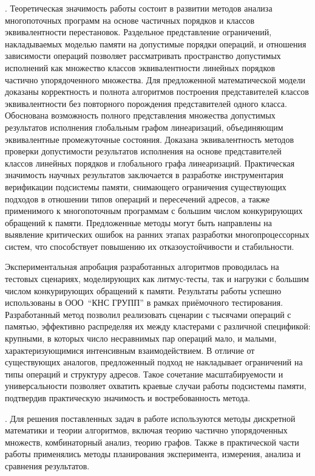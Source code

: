 {\influence}.
Теоретическая значимость работы состоит в развитии методов анализа
многопоточных программ на основе частичных порядков и классов
эквивалентности перестановок. Раздельное представление ограничений,
накладываемых моделью памяти на допустимые порядки операций, и
отношения зависимости операций позволяет рассматривать пространство
допустимых исполнений как множество классов эквивалентности линейных
порядков частично упорядоченного множества.
Для предложенной математической модели доказаны корректность и
полнота алгоритмов построения представителей классов эквивалентности
без повторного порождения представителей одного класса. Обоснована
возможность полного представления множества допустимых результатов
исполнения глобальным графом линеаризаций, объединяющим эквивалентные
промежуточные
состояния. Доказана эквивалентность методов проверки допустимости
результатов исполнения на основе представителей классов линейных
порядков и глобального графа линеаризаций.
Практическая значимость научных результатов заключается в разработке
инструментария верификации подсистемы памяти, снимающего ограничения
существующих подходов в отношении типов операций и пересечений
адресов, а также применимого к многопоточным программам с большим числом
конкурирующих обращений к памяти. Предложенные методы могут быть
направлены на выявление критических ошибок на
ранних этапах разработки многопроцессорных систем, что способствует повышению
их отказоустойчивости и стабильности.

Экспериментальная апробация разработанных алгоритмов проводилась на
тестовых сценариях, моделирующих как литмус-тесты, так и нагрузки с
большим числом конкурирующих обращений к памяти. Результаты работы
успешно использованы в ООО~``КНС ГРУПП'' в рамках приёмочного
тестирования.
Разработанный метод позволил реализовать сценарии с тысячами операций
с памятью, эффективно распределяя их между кластерами с различной
спецификой: крупными, в которых число несравнимых пар операций мало, и малыми,
характеризующимися интенсивным взаимодействием. В отличие от
существующих аналогов, предложенный подход не накладывает
ограничений на типы операций и структуру адресов. Такое сочетание
масштабируемости и универсальности позволяет охватить
краевые случаи работы подсистемы памяти, подтвердив
практическую значимость и востребованность метода.

{\methods}.
Для решения поставленных задач в работе используются
методы дискретной математики и теории алгоритмов, включая
теорию частично упорядоченных множеств, комбинаторный анализ, теорию
графов.
Также в практической части работы применялись методы планирования эксперимента,
измерения, анализа и сравнения результатов.


